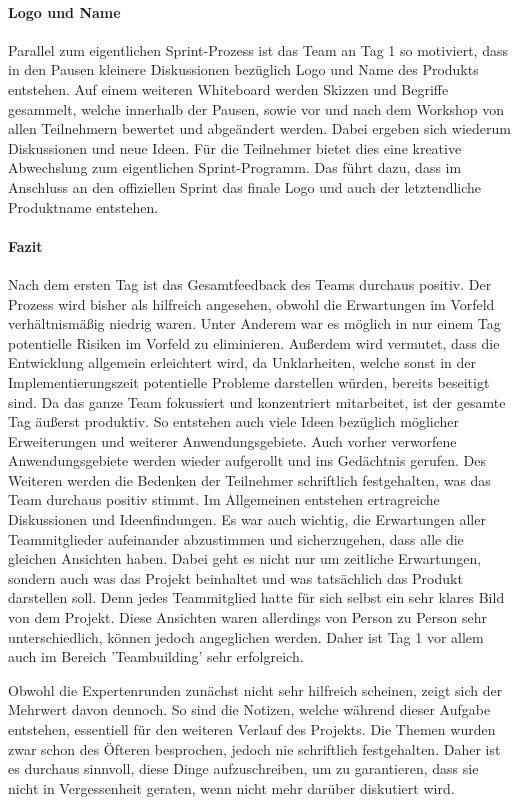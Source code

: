 \paragraph{Logo und Name}
Parallel zum eigentlichen Sprint-Prozess ist das Team an Tag 1 so motiviert, dass in den Pausen kleinere Diskussionen bezüglich Logo und Name des Produkts entstehen. Auf einem weiteren Whiteboard werden Skizzen und Begriffe gesammelt, welche innerhalb der Pausen, sowie vor und nach dem Workshop von allen Teilnehmern bewertet und abgeändert werden. Dabei ergeben sich wiederum Diskussionen und neue Ideen. Für die Teilnehmer bietet dies eine kreative Abwechslung zum eigentlichen Sprint-Programm. Das führt dazu, dass im Anschluss an den offiziellen Sprint das finale Logo und auch der letztendliche Produktname entstehen.

\paragraph{Fazit}
Nach dem ersten Tag ist das Gesamtfeedback des Teams durchaus positiv. Der Prozess wird bisher als hilfreich angesehen, obwohl die Erwartungen im Vorfeld verhältnismäßig niedrig waren. Unter Anderem war es möglich in nur einem Tag potentielle Risiken im Vorfeld zu eliminieren. Außerdem wird vermutet, dass die Entwicklung allgemein erleichtert wird, da Unklarheiten, welche sonst in der Implementierungszeit potentielle Probleme darstellen würden, bereits beseitigt sind. Da das ganze Team fokussiert und konzentriert mitarbeitet, ist der gesamte Tag äußerst produktiv. So entstehen auch viele Ideen bezüglich möglicher Erweiterungen und weiterer Anwendungsgebiete. Auch vorher verworfene Anwendungsgebiete werden wieder aufgerollt und ins Gedächtnis gerufen. Des Weiteren werden die Bedenken der Teilnehmer schriftlich festgehalten, was das Team durchaus positiv stimmt. Im Allgemeinen entstehen ertragreiche Diskussionen und Ideenfindungen. Es war auch wichtig, die Erwartungen aller Teammitglieder aufeinander abzustimmen und sicherzugehen, dass alle die gleichen Ansichten haben. Dabei geht es nicht nur um zeitliche Erwartungen, sondern auch was das Projekt beinhaltet und was tatsächlich das Produkt darstellen soll. Denn jedes Teammitglied hatte für sich selbst ein sehr klares Bild von dem Projekt. Diese Ansichten waren allerdings von Person zu Person sehr unterschiedlich, können jedoch angeglichen werden. Daher ist Tag 1 vor allem auch im Bereich 'Teambuilding' sehr erfolgreich.

Obwohl die Expertenrunden zunächst nicht sehr hilfreich scheinen, zeigt sich der Mehrwert davon dennoch. So sind die Notizen, welche während dieser Aufgabe entstehen, essentiell für den weiteren Verlauf des Projekts. Die Themen wurden zwar schon des Öfteren besprochen, jedoch nie schriftlich festgehalten. Daher ist es durchaus sinnvoll, diese Dinge aufzuschreiben, um zu garantieren, dass sie nicht in Vergessenheit geraten, wenn nicht mehr darüber diskutiert wird.

